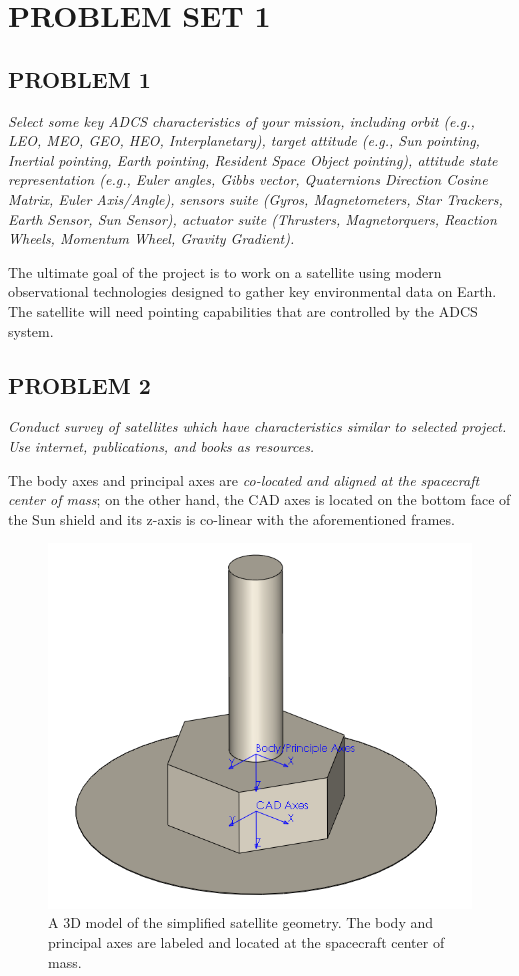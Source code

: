 \section{\Large PROBLEM SET 1}
\subsection{PROBLEM 1}
\textit{Select some key ADCS characteristics of your mission, including orbit (e.g., LEO, MEO, GEO, HEO, Interplanetary), target attitude (e.g., Sun pointing, Inertial pointing, Earth pointing, Resident Space Object pointing), attitude state representation (e.g., Euler angles, Gibbs vector, Quaternions Direction Cosine Matrix, Euler Axis/Angle), sensors suite (Gyros, Magnetometers, Star Trackers, Earth Sensor, Sun Sensor), actuator suite (Thrusters, Magnetorquers, Reaction Wheels, Momentum Wheel, Gravity Gradient).}

The ultimate goal of the project is to work on a satellite using modern observational technologies designed to gather key environmental data on Earth. The satellite will need pointing capabilities that are controlled by the ADCS system.

\subsection{PROBLEM 2}
\textit{Conduct survey of satellites which have characteristics similar to selected project. Use internet, publications, and books as resources.}

The body axes and principal axes are \textit{co-located and aligned at the spacecraft center of mass}; on the other hand, the CAD axes is located on the bottom face of the Sun shield and its z-axis is co-linear with the aforementioned frames.

\begin{figure}[H]
\centering
\includegraphics[scale=0.7]{Images/WMAP_CAD4.PNG}
\caption{A 3D model of the simplified satellite geometry. The body and principal axes are labeled and located at the spacecraft center of mass.}
\label{CAD model with frames}
\end{figure}


